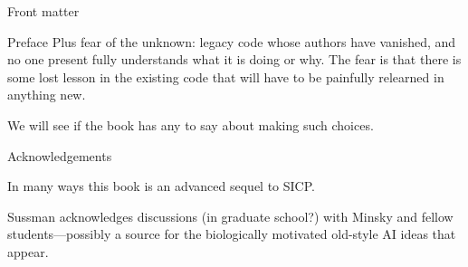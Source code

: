 \documentclass[12pt]{PalisadesLakesBook}
\begin{document}
\begin{plSection}{Front matter}
\begin{plSection}{Preface}
Plus fear of the unknown: legacy code whose authors have vanished,
and no one present fully understands what it is doing or why.
The fear is that there is some lost lesson in the existing
code that will have to be painfully relearned in anything new.

We will see if the book has any to say about making such choices.

\end{plSection}%
\begin{plSection}{Acknowledgements}
\begin{plQuote}
{}{}
In many ways this book is an advanced sequel to SICP.
\end{plQuote}

Sussman acknowledges discussions (in graduate school?)
with Minsky and fellow students---possibly a source for the
biologically motivated old-style AI ideas that appear.
\end{plSection}%
\end{plSection}%
\end{document}

